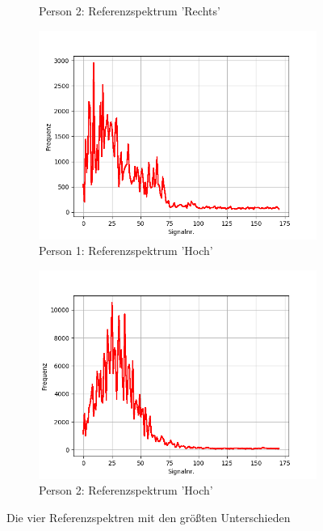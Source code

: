 \documentclass[12pt, oneside, a4paper, \docLanguage]{report}
\begin{document}
\begin{figure}[H]
\begin{subfigure}{.5\textwidth}
  		\caption{Person 2: Referenzspektrum 'Rechts'}
  		\label{fig:sub2}
	\end{subfigure}
\begin{subfigure}{.5\textwidth}
  		\centering
 		 \includegraphics[width=.95\linewidth]{../data/img/Versuch2/2Averagehoch.png}
  		\caption{Person 1: Referenzspektrum 'Hoch'}
 		 \label{fig:sub3}
	\end{subfigure}%
	\begin{subfigure}{.5\textwidth}
  		\centering
 		 \includegraphics[width=.95\linewidth]{../data/img/Versuch2/Averagehoch.png}
  		\caption{ Person 2: Referenzspektrum 'Hoch'}
  		\label{fig:sub4}
	\end{subfigure}
	\caption{Die vier Referenzspektren mit den größten Unterschieden}
	\label{fig:test}
\end{figure}
\newpage
\end{document}

